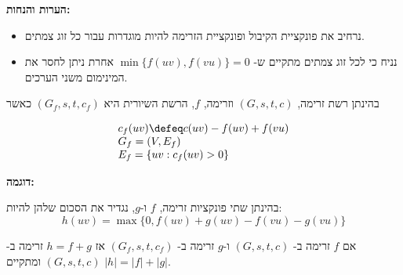 \textbf{הערות והנחות:}
\begin{itemize}
\item
נרחיב את פונקציית הקיבול ופונקציית הזרימה להיות מוגדרות עבור כל זוג צמתים.
\item
נניח כי לכל זוג צמתים מתקיים ש-%
$\min\{f(uv), f(vu)\} = 0$
אחרת ניתן לחסר את המינימום משני הערכים.
\end{itemize}

\begin{definition}
בהינתן רשת זרימה,
$(G, s, t, c)$
וזרימה, $f$, הרשת השיורית היא
$(G_f, s, t, c_f)$
כאשר

$$
\begin{array}{l}
c_f(uv) \defeq c(uv) - f(uv) + f(vu)
\\
{G_f = (V, E_f)}
\\
E_f = \{uv : c_f(uv) > 0\}
\end{array}
$$
\end{definition}

\textbf{דוגמה:}

\begin{center}
\end{center}

\begin{definition}
בהינתן שתי פונקציות זרימה, $f$ ו-$g$, נגדיר את הסכום שלהן להיות:
$$
h(uv) = \max\{0, f(uv) + g(uv) - f(vu) - g(vu)\}
$$
\end{definition}

\begin{lemma}
\label{lemma:addition}
אם $f$ זרימה ב-%
$(G, s, t, c)$
ו-$g$ זרימה ב-%
$(G_f, s, t, c_f)$
אז 
$h = f + g$
זרימה ב-%
$(G, s, t, c)$
ומתקיים 
$|h| = |f| + |g|$.
\end{lemma}

